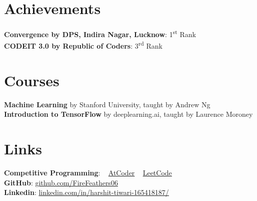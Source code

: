 \documentclass[margin, centered]{res}
\begin{document}
\begin{resume}
		\section{Achievements}
			\textbf{Convergence by DPS, Indira Nagar, Lucknow}: 1\textsuperscript{st} Rank\\
			\textbf{CODEIT 3.0 by Republic of Coders}: 3\textsuperscript{rd} Rank\\
		
		\section{Courses}
			\textbf{Machine Learning} by Stanford University, taught by Andrew Ng\\
			\textbf{Introduction to TensorFlow} by deeplearning.ai, taught by Laurence Moroney
		
		\section{Links}
			\textbf{Competitive Programming}:
			~
			\href{https://atcoder.jp/users/firefeathers}{AtCoder}
			~
			\href{https://leetcode.com/firefeathers/}{LeetCode}
			\\
			\textbf{GitHub}: \href{https://github.com/FireFeathers06}{github.com/FireFeathers06}
			\\
			\textbf{Linkedin}: \href{https://www.linkedin.com/in/harshit-tiwari-165418187/}{linkedin.com/in/harshit-tiwari-165418187/}
	\end{resume}
\end{document}
